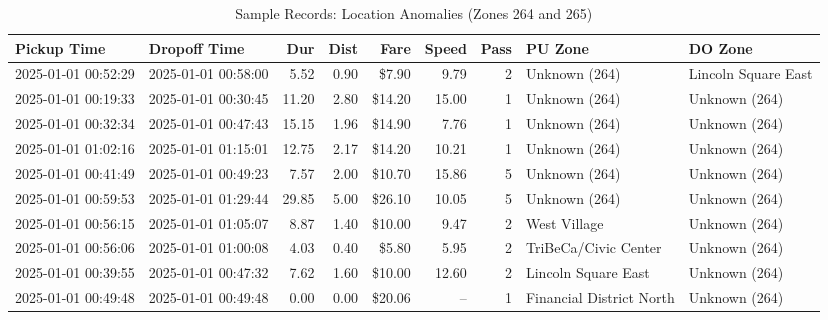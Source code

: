 \documentclass[11pt,a4paper]{article}
\begin{document}
\begin{table}[htbp]
\centering
\caption{Sample Records: Location Anomalies (Zones 264 and 265)}
\label{tab:sample_locations}
\tiny
\begin{tabularx}{\textwidth}{l l r r r r r X X}
\toprule
\textbf{Pickup Time} & \textbf{Dropoff Time} & \textbf{Dur} & \textbf{Dist} & \textbf{Fare} & \textbf{Speed} & \textbf{Pass} & \textbf{PU Zone} & \textbf{DO Zone} \\
\midrule
2025-01-01 00:52:29 & 2025-01-01 00:58:00 & 5.52 & 0.90 & \$7.90 & 9.79 & 2 & Unknown (264) & Lincoln Square East \\
2025-01-01 00:19:33 & 2025-01-01 00:30:45 & 11.20 & 2.80 & \$14.20 & 15.00 & 1 & Unknown (264) & Unknown (264) \\
2025-01-01 00:32:34 & 2025-01-01 00:47:43 & 15.15 & 1.96 & \$14.90 & 7.76 & 1 & Unknown (264) & Unknown (264) \\
2025-01-01 01:02:16 & 2025-01-01 01:15:01 & 12.75 & 2.17 & \$14.20 & 10.21 & 1 & Unknown (264) & Unknown (264) \\
2025-01-01 00:41:49 & 2025-01-01 00:49:23 & 7.57 & 2.00 & \$10.70 & 15.86 & 5 & Unknown (264) & Unknown (264) \\
2025-01-01 00:59:53 & 2025-01-01 01:29:44 & 29.85 & 5.00 & \$26.10 & 10.05 & 5 & Unknown (264) & Unknown (264) \\
2025-01-01 00:56:15 & 2025-01-01 01:05:07 & 8.87 & 1.40 & \$10.00 & 9.47 & 2 & West Village & Unknown (264) \\
2025-01-01 00:56:06 & 2025-01-01 01:00:08 & 4.03 & 0.40 & \$5.80 & 5.95 & 2 & TriBeCa/Civic Center & Unknown (264) \\
2025-01-01 00:39:55 & 2025-01-01 00:47:32 & 7.62 & 1.60 & \$10.00 & 12.60 & 2 & Lincoln Square East & Unknown (264) \\
2025-01-01 00:49:48 & 2025-01-01 00:49:48 & 0.00 & 0.00 & \$20.06 & -- & 1 & Financial District North & Unknown (264) \\
\bottomrule
\end{tabularx}
\end{table}
\end{document}
